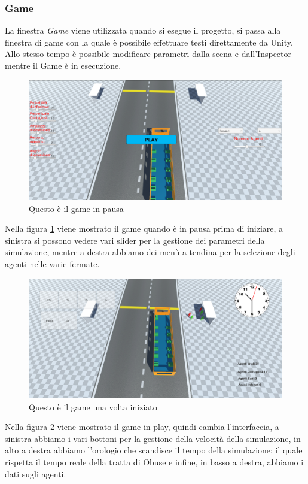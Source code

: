 \documentclass[12pt, openany]{book}
\begin{document}
	\subsubsection{Game}
		La finestra \emph{Game} viene utilizzata quando si esegue il progetto, si passa alla finestra di game con la quale è possibile effettuare testi direttamente da Unity. Allo stesso tempo è possibile modificare parametri dalla scena e dall'Inspector mentre il Game è in esecuzione.
		\begin{figure}[H]
			\centering
			\includegraphics[width=1\linewidth]{"Immagini/PausedGame.png"}
			\caption{Questo è il game in pausa}
			\label{fig:PausedGame}
		\end{figure}
	Nella figura \ref{fig:PausedGame} viene mostrato il game quando è in pausa prima di iniziare, a sinistra si possono vedere vari slider per la gestione dei parametri della simulazione, mentre a destra abbiamo dei menù a tendina per la selezione degli agenti nelle varie fermate.
	\begin{figure}[H]
		\centering
		\includegraphics[width=1\linewidth]{"Immagini/PlayingGame.png"}
		\caption{Questo è il game una volta iniziato}
		\label{fig:PlayingGame}
	\end{figure}
	Nella figura \ref{fig:PlayingGame} viene mostrato il game in play, quindi cambia l'interfaccia, a sinistra abbiamo i vari bottoni per la gestione della velocità della simulazione, in alto a destra abbiamo l'orologio che scandisce il tempo della simulazione; il quale rispetta il tempo reale della tratta di Obuse e infine, in basso a destra, abbiamo i dati sugli agenti.
\end{document}
